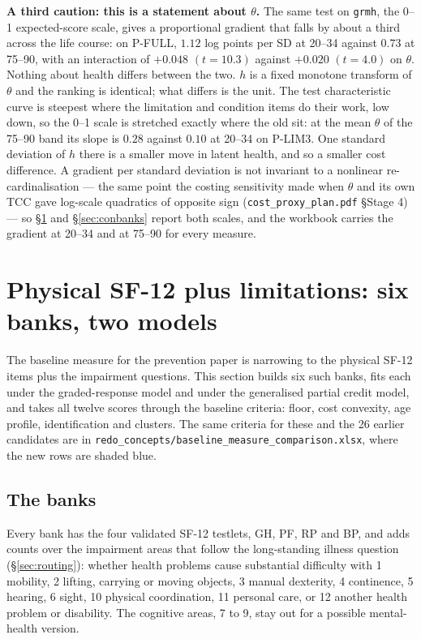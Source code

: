 \documentclass[11pt]{article}
\newcommand{\code}[1]{\texttt{\small #1}}
\begin{document}
\textbf{A third caution: this is a statement about $\theta$.} The same test on
\code{grmh}, the 0--1 expected-score scale, gives a proportional gradient that
falls by about a third across the life course: on P-FULL, $1.12$ log points per
SD at 20--34 against $0.73$ at 75--90, with an interaction of $+0.048$
$(t = 10.3)$ against $+0.020$ $(t = 4.0)$ on $\theta$. Nothing about health
differs between the two. $h$ is a fixed monotone transform of $\theta$ and the
ranking is identical; what differs is the unit. The test characteristic curve
is steepest where the limitation and condition items do their work, low down,
so the 0--1 scale is stretched exactly where the old sit: at the mean $\theta$
of the 75--90 band its slope is $0.28$ against $0.10$ at 20--34 on P-LIM3. One
standard deviation of $h$ there is a smaller move in latent health, and so a
smaller cost difference. A gradient per standard deviation is not invariant to
a nonlinear re-cardinalisation --- the same point the costing sensitivity made
when $\theta$ and its own TCC gave log-scale quadratics of opposite sign
(\code{cost\_proxy\_plan.pdf} \S Stage 4) --- so \S\ref{sec:limbanks} and
\S\ref{sec:conbanks} report both scales, and the workbook carries the gradient
at 20--34 and at 75--90 for every measure.

\section{Physical SF-12 plus limitations: six banks, two models}
\label{sec:limbanks}

The baseline measure for the prevention paper is narrowing to the physical
SF-12 items plus the impairment questions. This section builds six such
banks, fits each under the graded-response model and under the generalised
partial credit model, and takes all twelve scores through the baseline
criteria: floor, cost convexity, age profile, identification and clusters.
The same criteria for these and the 26 earlier candidates are in
\code{redo\_concepts/baseline\_measure\_comparison.xlsx}, where the new rows
are shaded blue.

\subsection{The banks}
Every bank has the four validated SF-12 testlets, GH, PF, RP and BP, and adds
counts over the impairment areas that follow the long-standing illness
question (\S\ref{sec:routing}): whether health problems cause substantial
difficulty with 1 mobility, 2 lifting, carrying or moving objects, 3 manual
dexterity, 4 continence, 5 hearing, 6 sight, 10 physical coordination,
11 personal care, or 12 another health problem or disability. The cognitive
areas, 7 to 9, stay out for a possible mental-health version.
\end{document}
